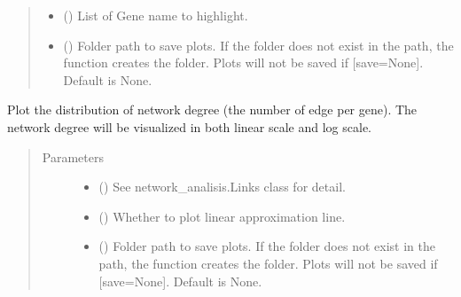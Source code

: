 \documentclass[letterpaper,10pt,english]{sphinxmanual}
\begin{document}
\begin{fulllineitems}
\begin{fulllineitems}
\begin{quote}
\begin{description}
\begin{itemize}
\item {} 
 () \textendash{} List of Gene name to highlight.

\item {} 
 () \textendash{} Folder path to save plots. If the folder does not exist in the path, the function creates the folder.
Plots will not be saved if {[}save=None{]}. Default is None.

\end{itemize}

\end{description}\end{quote}

\end{fulllineitems}


\begin{fulllineitems}
\label{\detokenize{modules/celloracle:celloracle.Links.plot_degree_distributions}}
Plot the distribution of network degree (the number of edge per gene).
The network degree will be visualized in both linear scale and log scale.
\begin{quote}\begin{description}
\item[{Parameters}] \leavevmode\begin{itemize}
\item {} 
 ({\hyperref[\detokenize{modules/celloracle:celloracle.Links}]{}}) \textendash{} See network\_analisis.Links class for detail.

\item {} 
 () \textendash{} Whether to plot linear approximation line.

\item {} 
 () \textendash{} Folder path to save plots. If the folder does not exist in the path, the function creates the folder.
Plots will not be saved if {[}save=None{]}. Default is None.


\end{itemize}
\end{description}
\end{quote}
\end{fulllineitems}
\end{fulllineitems}
\end{document}
